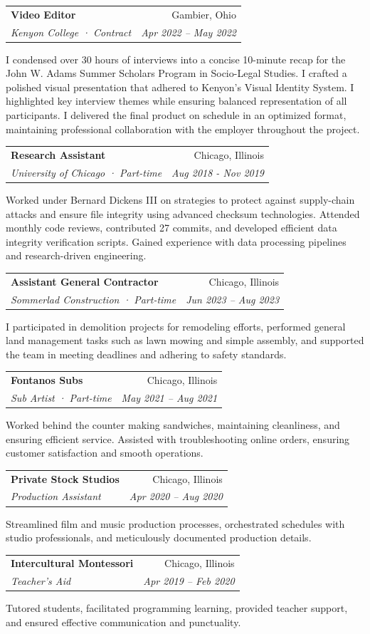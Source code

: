 \documentclass[letterpaper,10pt]{article}
\makeatletter
\newcommand{\resumeSubheading}[4]{
	\vspace{-2pt}\item
	\begin{tabular*}{0.97\textwidth}[t]{l@{\extracolsep{\fill}}r}
		\textbf{#1} & #2 \\
		\textit{\small#3} & \textit{\small #4} \\
	\end{tabular*}\vspace{-7pt}
}
\newcommand{\resumeParagraph}[1]{
	\item[]
	\parbox{\linewidth}{
		\small{#1\xspace} %
	}
	\vspace{-7pt}
}
\makeatother
\begin{document}
\resumeSubheading
{Video Editor}{Gambier, Ohio}
{Kenyon College · Contract}{Apr 2022 – May 2022}
\resumeParagraph{I condensed over 30 hours of interviews into a concise 10-minute recap for the John W. Adams Summer Scholars Program in Socio-Legal Studies. I crafted a polished visual presentation that adhered to Kenyon’s Visual Identity System. I highlighted key interview themes while ensuring balanced representation of all participants. I delivered the final product on schedule in an optimized format, maintaining professional collaboration with the employer throughout the project.}

\vspace{2pt}

\resumeSubheading
{Research Assistant}{Chicago, Illinois}
{University of Chicago · Part-time}{Aug 2018 - Nov 2019}
\resumeParagraph{Worked under Bernard Dickens III on strategies to protect against supply-chain attacks and ensure file integrity using advanced checksum technologies. Attended monthly code reviews, contributed 27 commits, and developed efficient data integrity verification scripts. Gained experience with data processing pipelines and research-driven engineering.}

\iffalse

\resumeSubheading
{Assistant General Contractor}{Chicago, Illinois}
{Sommerlad Construction · Part-time}{Jun 2023 – Aug 2023}
\resumeParagraph{I participated in demolition projects for remodeling efforts, performed general land management tasks such as lawn mowing and simple assembly, and supported the team in meeting deadlines and adhering to safety standards.}

\resumeSubheading
{Fontanos Subs}{Chicago, Illinois}
{Sub Artist · Part-time}{May 2021 – Aug 2021}
\resumeParagraph{Worked behind the counter making sandwiches, maintaining cleanliness, and ensuring efficient service. Assisted with troubleshooting online orders, ensuring customer satisfaction and smooth operations.}

\resumeSubheading
{Private Stock Studios}{Chicago, Illinois}
{Production Assistant}{Apr 2020 – Aug 2020}
\resumeParagraph{Streamlined film and music production processes, orchestrated schedules with studio professionals, and meticulously documented production details.}

\resumeSubheading
{Intercultural Montessori}{Chicago, Illinois}
{Teacher’s Aid}{Apr 2019 – Feb 2020}
\resumeParagraph{Tutored students, facilitated programming learning, provided teacher support, and ensured effective communication and punctuality.}
\end{document}
